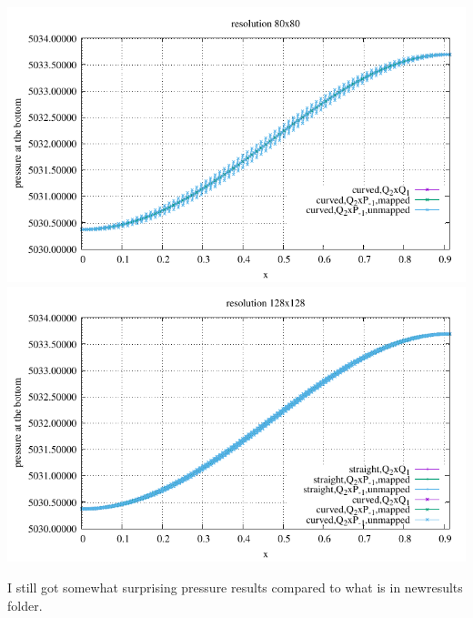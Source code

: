 \begin{center}
\includegraphics[width=14cm]{python_codes/fieldstone_25/results/isoviscous/pbottom80.pdf}\\
\includegraphics[width=14cm]{python_codes/fieldstone_25/results/isoviscous/pbottom128.pdf}
\end{center}

I still got somewhat surprising pressure results compared to what is in newresults folder. 





